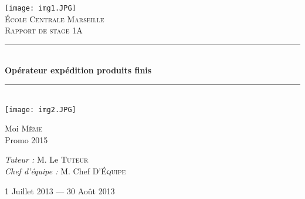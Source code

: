 \documentclass[12pt, openany]{report}
\newcommand{\HRule}{\rule{\linewidth}{0.5mm}}
\begin{document}
\begin{titlepage}
  \begin{sffamily}
  \begin{center}

    \texttt{[image: img1.JPG]}~\\[1.5cm]

    \textsc{\LARGE École Centrale Marseille}\\[2cm]

    \textsc{\Large Rapport de stage 1A}\\[1.5cm]

    \HRule \\[0.4cm]
    { \huge \bfseries Opérateur expédition produits finis\\[0.4cm] }

    \HRule \\[2cm]
    \texttt{[image: img2.JPG]}
    \\[2cm]

    \begin{minipage}{0.4\textwidth}
      \begin{flushleft} \large
        Moi \textsc{Même}\\
        Promo 2015\\
      \end{flushleft}
    \end{minipage}
    \begin{minipage}{0.4\textwidth}
      \begin{flushright} \large
        \emph{Tuteur :} M. Le \textsc{Tuteur}\\
        \emph{Chef d'équipe : } M. Chef \textsc{D’Équipe}
      \end{flushright}
    \end{minipage}

    \vfill

    {\large 1\ier{} Juillet 2013 — 30 Août 2013}

  \end{center}
  \end{sffamily}
\end{titlepage}
\end{document}
